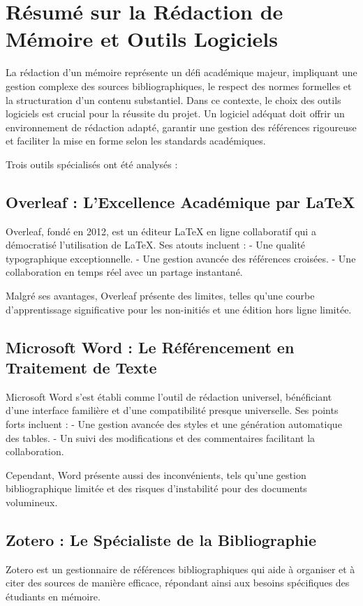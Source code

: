 \documentclass[12pt,a4paper]{article}
\begin{document}
\section{Résumé sur la Rédaction de Mémoire et Outils Logiciels}

La rédaction d'un mémoire représente un défi académique majeur, impliquant une gestion complexe des sources bibliographiques, le respect des normes formelles et la structuration d'un contenu substantiel. Dans ce contexte, le choix des outils logiciels est crucial pour la réussite du projet. Un logiciel adéquat doit offrir un environnement de rédaction adapté, garantir une gestion des références rigoureuse et faciliter la mise en forme selon les standards académiques.

Trois outils spécialisés ont été analysés :

\subsection{Overleaf : L'Excellence Académique par LaTeX}
Overleaf, fondé en 2012, est un éditeur LaTeX en ligne collaboratif qui a démocratisé l'utilisation de LaTeX. Ses atouts incluent :
- Une qualité typographique exceptionnelle.
- Une gestion avancée des références croisées.
- Une collaboration en temps réel avec un partage instantané.

Malgré ses avantages, Overleaf présente des limites, telles qu'une courbe d'apprentissage significative pour les non-initiés et une édition hors ligne limitée.

\subsection{Microsoft Word : Le Référencement en Traitement de Texte}
Microsoft Word s'est établi comme l'outil de rédaction universel, bénéficiant d'une interface familière et d'une compatibilité presque universelle. Ses points forts incluent :
- Une gestion avancée des styles et une génération automatique des tables.
- Un suivi des modifications et des commentaires facilitant la collaboration.

Cependant, Word présente aussi des inconvénients, tels qu'une gestion bibliographique limitée et des risques d'instabilité pour des documents volumineux.

\subsection{Zotero : Le Spécialiste de la Bibliographie}
Zotero est un gestionnaire de références bibliographiques qui aide à organiser et à citer des sources de manière efficace, répondant ainsi aux besoins spécifiques des étudiants en mémoire.
\end{document}
